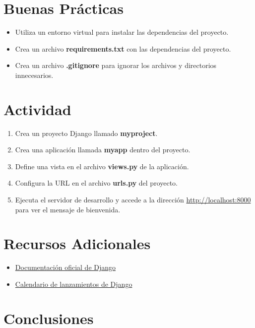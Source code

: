 \documentclass[
  a4paper,
  DIV=11,
  numbers=noendperiod,
  onepage,
  openany]{scrreprt}
\providecommand{\tightlist}{%
  \setlength{\itemsep}{0pt}\setlength{\parskip}{0pt}}\usepackage{longtable,booktabs,array}
\begin{document}
\chapter{Buenas Prácticas}\label{buenas-pruxe1cticas}

\begin{itemize}
\tightlist
\item
  Utiliza un entorno virtual para instalar las dependencias del
  proyecto.
\item
  Crea un archivo \textbf{requirements.txt} con las dependencias del
  proyecto.
\item
  Crea un archivo \textbf{.gitignore} para ignorar los archivos y
  directorios innecesarios.
\end{itemize}

\chapter{Actividad}\label{actividad-5}

\begin{enumerate}
\def\labelenumi{\arabic{enumi}.}
\tightlist
\item
  Crea un proyecto Django llamado \textbf{myproject}.
\item
  Crea una aplicación llamada \textbf{myapp} dentro del proyecto.
\item
  Define una vista en el archivo \textbf{views.py} de la aplicación.
\item
  Configura la URL en el archivo \textbf{urls.py} del proyecto.
\item
  Ejecuta el servidor de desarrollo y accede a la dirección
  \url{http://localhost:8000} para ver el mensaje de bienvenida.
\end{enumerate}

\chapter{Recursos Adicionales}\label{recursos-adicionales}

\begin{itemize}
\tightlist
\item
  \href{https://docs.djangoproject.com/en/stable/}{Documentación oficial
  de Django}
\item
  \href{https://docs.djangoproject.com/en/stable/releases}{Calendario de
  lanzamientos de Django}
\end{itemize}

\chapter{Conclusiones}\label{conclusiones-13}
\end{document}
